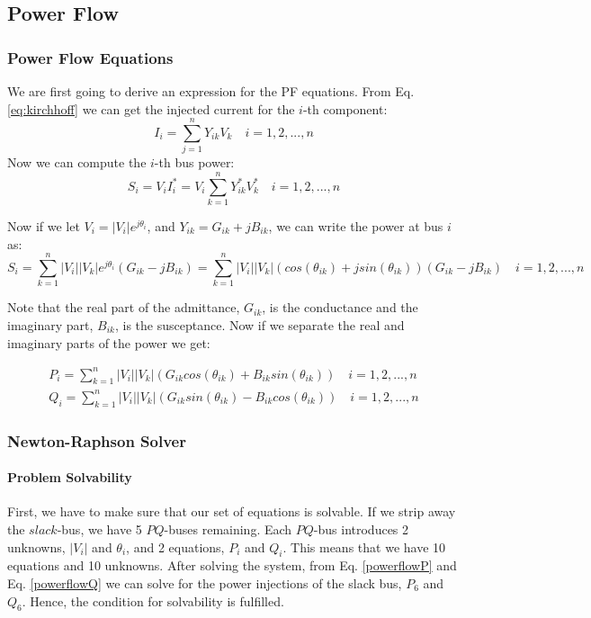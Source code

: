 \documentclass[a4paper,11pt, titlepage, twoside]{article}
\begin{document}
\subsection{Power Flow }
\subsubsection{Power Flow Equations}

We are first going to derive an expression for the PF equations.
From Eq. \ref{eq:kirchhoff} we can get the injected current for the $i$-th component:
\begin{equation}
    I_i = \sum_{j=1}^{n} Y_{ik}V_k \quad i = 1,2,...,n
\end{equation}
Now we can compute the $i$-th bus power:
\begin{equation}
    S_i = V_iI_i^* = V_i\sum_{k=1}^{n} Y_{ik}^*V_k^* \quad i = 1,2,...,n
\end{equation}

Now if we let $V_i = |V_i|e^{j\theta_i}$, and $Y_{ik} = G_{ik} + jB_{ik}$, we can write the power at bus $i$ as:
\begin{equation}
    S_i = \sum_{k=1}^n|V_i||V_k|e^{j\theta_i}(G_{ik} - jB_{ik}) = \sum_{k=1}^n|V_i||V_k|(cos(\theta_{ik})+jsin(\theta_{ik}))(G_{ik} - jB_{ik}) \quad i = 1,2,...,n
\end{equation}

Note that the real part of the admittance, $G_{ik}$, is the conductance and the imaginary part, $B_{ik}$, is the susceptance. Now if we separate the real and imaginary parts of the power we get:

\begin{align}
    P_i= \sum_{k=1}^n|V_i||V_k|(G_{ik}cos(\theta_{ik}) + B_{ik}sin(\theta_{ik}))\label{powerflowP} \quad i= 1,2,...,n \\
    Q_i= \sum_{k=1}^n|V_i||V_k|(G_{ik}sin(\theta_{ik}) - B_{ik}cos(\theta_{ik}))\label{powerflowQ} \quad i= 1,2,...,n
\end{align}  


\subsubsection{Newton-Raphson Solver}\label{NRsolver}

\paragraph{Problem Solvability}

First, we have to make sure that our set of equations is solvable. If we strip away the $slack$-bus, we have 5 $PQ$-buses remaining. Each $PQ$-bus introduces 2 unknowns, $|V_i|$ and $\theta_i$, and 2 equations, $P_i$ and $Q_i$. This means that we have 10 equations and 10 unknowns. 
After solving the system, from  Eq. \ref{powerflowP} and Eq. \ref{powerflowQ} we can solve for the power injections of the slack bus, $P_6$ and $Q_6$. Hence, the condition for solvability is fulfilled.
\end{document}
